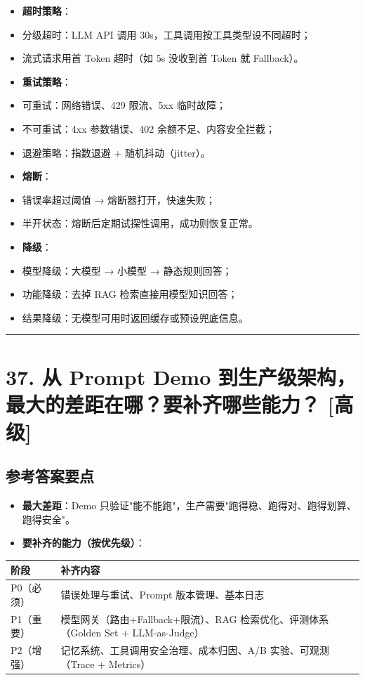 \documentclass[9pt,a4paper,twocolumn]{ctexart}
\newcommand{\lvgao}{\usebox{\badgegaobox}}
\def\lvgao{[高级]}%
\begin{document}
\begin{itemize}[itemsep=1pt, topsep=2pt]
  \item \textbf{超时策略}：
  \item 分级超时：LLM API 调用 30s，工具调用按工具类型设不同超时；
  \item 流式请求用首 Token 超时（如 5s 没收到首 Token 就 Fallback）。
  \item \textbf{重试策略}：
  \item 可重试：网络错误、429 限流、5xx 临时故障；
  \item 不可重试：4xx 参数错误、402 余额不足、内容安全拦截；
  \item 退避策略：指数退避 + 随机抖动（jitter）。
  \item \textbf{熔断}：
  \item 错误率超过阈值 → 熔断器打开，快速失败；
  \item 半开状态：熔断后定期试探性调用，成功则恢复正常。
  \item \textbf{降级}：
  \item 模型降级：大模型 → 小模型 → 静态规则回答；
  \item 功能降级：去掉 RAG 检索直接用模型知识回答；
  \item 结果降级：无模型可用时返回缓存或预设兜底信息。
\end{itemize}


\vspace{2pt}
\noindent\rule{\columnwidth}{0.3pt}\vspace{2pt}



\section*{37. 从 Prompt Demo 到生产级架构，最大的差距在哪？要补齐哪些能力？ \lvgao{}}


\subsection*{参考答案要点}

\begin{itemize}[itemsep=1pt, topsep=2pt]
  \item \textbf{最大差距}：Demo 只验证"能不能跑"，生产需要"跑得稳、跑得对、跑得划算、跑得安全"。
  \item \textbf{要补齐的能力（按优先级）}：
\end{itemize}

{\footnotesize
\begin{tabular}{|p{}|p{}|}
\hline
\textbf{阶段} & \textbf{补齐内容} \\
\hline
P0（必须） & 错误处理与重试、Prompt 版本管理、基本日志 \\
\hline
P1（重要） & 模型网关（路由+Fallback+限流）、RAG 检索优化、评测体系（Golden Set + LLM-as-Judge） \\
\hline
P2（增强） & 记忆系统、工具调用安全治理、成本归因、A/B 实验、可观测（Trace + Metrics） \\
\hline
\end{tabular}
}
\end{document}
